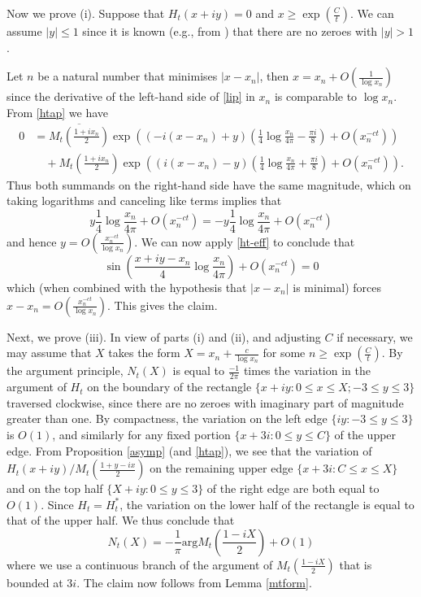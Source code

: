 \documentclass[a4paper,11pt,twoside]{amsart}
\begin{document}
Now we prove (i).
Suppose that $H_t(x+iy)=0$ and $x \geq \exp(\frac{C}{t})$.  We can assume $|y| \leq 1$ since it is known (e.g., from \cite[Theorem 13]{debr}) that there are no zeroes with $|y|>1$.  

Let $n$ be a natural number that minimises $|x-x_n|$, then $x = x_n+O\left(\frac{1}{\log x_n}\right)$ since the derivative of the left-hand side of \eqref{lip} in $x_n$ is comparable to $\log x_n$.  From \eqref{htap} we have
\begin{align*}
0 &= \overline{M_t\left(\frac{1+ix_n}{2}\right)} \exp\left( (-i(x-x_n)+y) \left(\frac{1}{4} \log \frac{x_n}{4\pi} - \frac{\pi i}{8}\right) + O( x_n^{-ct} )\right) \\
&\quad + M_t(\frac{1+ix_n}{2}) \exp\left( (i(x-x_n)-y) \left(\frac{1}{4} \log \frac{x_n}{4\pi} + \frac{\pi i}{8}\right) + O( x_n^{-ct} )\right).
\end{align*}
Thus both summands on the right-hand side have the same magnitude, which on taking logarithms and canceling like terms implies that
$$ y \frac{1}{4} \log \frac{x_n}{4\pi} + O( x_n^{-ct} ) = -y \frac{1}{4} \log \frac{x_n}{4\pi} + O( x_n^{-ct} )$$
and hence $y = O\left( \frac{x_n^{-ct}}{\log x_n} \right)$.  We can now apply \eqref{ht-eff} to conclude that
$$ \sin\left(\frac{x+iy-x_n}{4} \log \frac{x_n}{4\pi}\right) + O( x_n^{-ct} ) = 0$$
which (when combined with the hypothesis that $|x-x_n|$ is minimal) forces $x - x_n = O\left( \frac{x_n^{-ct}}{\log x_n} \right)$.  This gives the claim.

Next, we prove (iii).  In view of parts (i) and (ii), and adjusting $C$ if necessary, we may assume that $X$ takes the form $X = x_n+\frac{c}{\log x_n}$ for some $n \geq \exp( \frac{C}{t})$.  By the argument principle, $N_t(X)$ is equal to $\frac{-1}{2\pi}$ times the variation in the argument of $H_t$ on the boundary of the rectangle $\{ x+iy: 0 \leq x \leq X; -3 \leq y \leq 3 \}$ traversed clockwise, since there are no zeroes with imaginary part of magnitude greater than one.  By compactness, the variation on the left edge $\{ iy: -3 \leq y \leq 3 \}$ is $O(1)$, and similarly for any fixed portion $\{ x+3i: 0 \leq y \leq C \}$ of the upper edge.  From Proposition \ref{asymp} (and \eqref{htap}), we see that the variation of $H_t(x+iy) / M_t(\frac{1+y-ix}{2})$ on the remaining upper edge $\{ x+3i: C \leq x \leq X \}$ and on the top half $\{ X+iy: 0 \leq y \leq 3 \}$ of the right edge are both equal to $O(1)$.  Since $H_t = H_t^*$, the variation on the lower half of the rectangle is equal to that of the upper half. We thus conclude that
$$ N_t(X) = -\frac{1}{\pi} \mathrm{arg} M_t\left(\frac{1-iX}{2}\right)+ O(1)$$
where we use a continuous branch of the argument of $M_t\left(\frac{1-iX}{2}\right)$ that is bounded at $3i$.  The claim now follows from Lemma \ref{mtform}.
\end{document}

